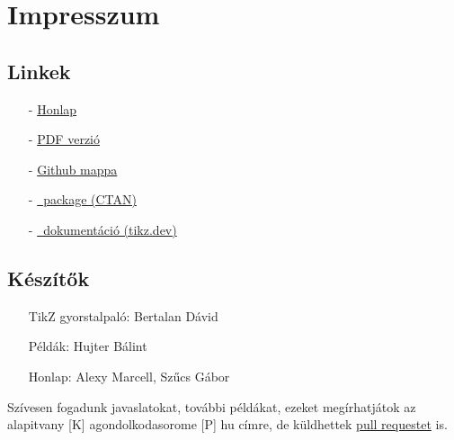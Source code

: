 \chapter{Impresszum}

\section{Linkek}
\begin{enumerate}
    \item[-] \href{./index.html}{Honlap}
    \item[-] \href{./mainpage.pdf}{PDF verzió}
    \item[-] \href{https://github.com/a-gondolkodas-orome/tikz-tutorial}{Github mappa} 
    \item[-] \href{https://ctan.ijs.si/tex-archive/graphics/pgf/base/doc/pgfmanual.pdf}{\tikzname\ package (CTAN)} 
    \item[-] \href{https://tikz.dev/}{\tikzname\ dokumentáció (tikz.dev)} 
\end{enumerate}
        
\section{Készítők}
\begin{enumerate}
    \item[] TikZ gyorstalpaló: Bertalan Dávid
    \item[] Példák: Hujter Bálint
    \item[] Honlap: Alexy Marcell, Szűcs Gábor
\end{enumerate}

Szívesen fogadunk javaslatokat, további példákat, ezeket megírhatjátok az alapitvany [K] agondolkodasorome [P] hu címre, de küldhettek \href{https://github.com/a-gondolkodas-orome/tikz-tutorial/pulls}{pull requestet} is. 
